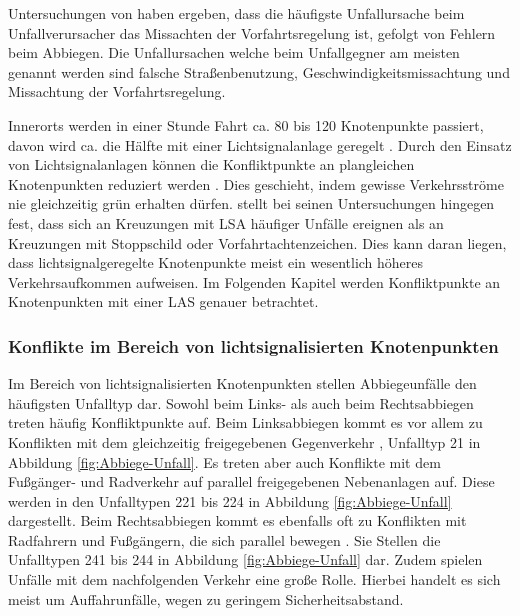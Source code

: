 Untersuchungen von \Textcite[S. 112]{Gerstenberger.17.02.2015} haben ergeben, dass die häufigste Unfallursache beim Unfallverursacher das Missachten der Vorfahrtsregelung ist, gefolgt von Fehlern beim Abbiegen. Die Unfallursachen welche beim Unfallgegner am meisten genannt werden sind falsche Straßenbenutzung, Geschwindigkeitsmissachtung und Missachtung der Vorfahrtsregelung. 

Innerorts werden in einer Stunde Fahrt ca. 80 bis 120 Knotenpunkte passiert, davon wird ca. die Hälfte mit einer Lichtsignalanlage geregelt \parencite[S. 114]{Reichart.2001}. Durch den Einsatz von Lichtsignalanlagen können die Konfliktpunkte an plangleichen Knotenpunkten reduziert werden \parencite[S. 83]{Reichart.2001}. Dies geschieht, indem gewisse Verkehrsströme nie gleichzeitig grün erhalten dürfen. \Textcite[S. 417]{AbdelAty.2005} stellt bei seinen Untersuchungen hingegen fest, dass sich an Kreuzungen mit LSA häufiger Unfälle ereignen als an Kreuzungen mit Stoppschild oder Vorfahrtachtenzeichen. Dies kann daran liegen, dass lichtsignalgeregelte Knotenpunkte meist ein wesentlich höheres Verkehrsaufkommen aufweisen. Im Folgenden Kapitel werden Konfliktpunkte an Knotenpunkten mit einer LAS genauer betrachtet.


\subsubsection{Konflikte im Bereich von lichtsignalisierten Knotenpunkten}\label{chapter:Knotenpunkte mit LSA}

Im Bereich von lichtsignalisierten Knotenpunkten stellen Abbiegeunfälle den häufigsten Unfalltyp dar. Sowohl beim Links- als auch beim Rechtsabbiegen treten häufig Konfliktpunkte auf. Beim Linksabbiegen kommt es vor allem zu Konflikten mit dem gleichzeitig freigegebenen Gegenverkehr \parencite[S. 273]{Schreiber.2016}, Unfalltyp 21 in Abbildung \ref{fig:Abbiege-Unfall}. Es treten aber auch Konflikte mit dem Fußgänger- und Radverkehr auf parallel freigegebenen Nebenanlagen auf. Diese werden in den Unfalltypen 221 bis 224 in Abbildung \ref{fig:Abbiege-Unfall} dargestellt. Beim Rechtsabbiegen kommt es ebenfalls oft zu Konflikten mit Radfahrern und Fußgängern, die sich parallel bewegen \parencite[S. 273]{Schreiber.2016}. Sie Stellen die Unfalltypen 241 bis 244 in Abbildung \ref{fig:Abbiege-Unfall} dar. Zudem spielen Unfälle mit dem nachfolgenden Verkehr eine große Rolle. Hierbei handelt es sich meist um Auffahrunfälle, wegen zu geringem Sicherheitsabstand.

